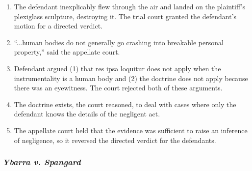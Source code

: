 \begin{enumerate}
    \item The defendant inexplicably flew through the air and landed on the plaintiff's plexiglass sculpture, destroying it. The trial court granted the defendant's motion for a directed verdict.
    \item ``...human bodies do not generally go crashing into breakable personal property,'' said the appellate court.
    \item Defendant argued (1) that res ipsa loquitur does not apply when the instrumentality is a human body and (2) the doctrine does not apply because there was an eyewitness. The court rejected both of these arguments.
    \item The doctrine exists, the court reasoned, to deal with cases where only the defendant knows the details of the negligent act.
    \item The appellate court held that the evidence was sufficient to raise an inference of negligence, so it reversed the directed verdict for the defendants.
\end{enumerate}

\subsubsection{\emph{Ybarra v. Spangard}}

